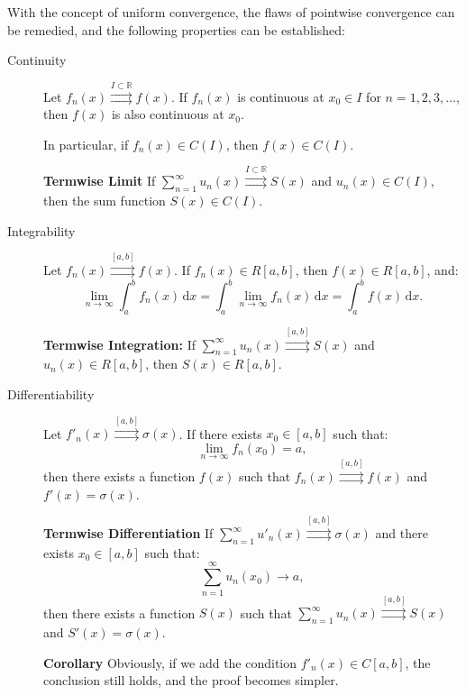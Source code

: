\documentclass[11pt]{../../TexTemplate/elegantbook}
\begin{document}
With the concept of uniform convergence, the flaws of pointwise convergence can be remedied,
and the following properties can be established:
\begin{property}
    \begin{description}
        \item  [Continuity]
            Let \( f_n(x) \mathop{\rightrightarrows}\limits^{I \subset \mathbb{R}} f(x) \). 
            If \( f_n(x) \) is continuous at \( x_0 \in I \) for \( n = 1, 2, 3, \dots \), 
            then \( f(x) \) is also continuous at \( x_0 \). 

            In particular, if \( f_n(x) \in C(I) \), then \( f(x) \in C(I) \).

            \textbf{Termwise Limit} If \( \sum_{n=1}^\infty u_n(x) \mathop{\rightrightarrows}\limits^{I \subset \mathbb{R}} S(x) \) 
            and \( u_n(x) \in C(I) \), then the sum function \( S(x) \in C(I) \).
        \item  [Integrability]
            Let \( f_n(x) \mathop{\rightrightarrows}\limits^{[a, b]} f(x) \). 
            If \( f_n(x) \in R[a, b] \), then \( f(x) \in R[a, b] \), and:
            \[
            \lim_{n \to \infty} \int_a^b f_n(x) \, \mathrm{d}x = \int_a^b \lim_{n \to \infty} f_n(x) \, \mathrm{d}x = \int_a^b f(x) \, \mathrm{d}x.
            \]

            \textbf{Termwise Integration:} If \( \sum_{n=1}^\infty u_n(x) \mathop{\rightrightarrows}\limits^{[a, b]} S(x) \) 
            and \( u_n(x) \in R[a, b] \), then \( S(x) \in R[a, b] \).

        \item [Differentiability]
            Let \( f'_n(x) \mathop{\rightrightarrows}\limits^{[a, b]} \sigma(x) \). 
            If there exists \( x_0 \in [a, b] \) such that:
            \[
            \lim_{n \to \infty} f_n(x_0) = a,
            \]
            then there exists a function \( f(x) \) such that \( f_n(x) \mathop{\rightrightarrows}\limits^{[a, b]} f(x) \) 
            and \( f'(x) = \sigma(x) \).
            
            \textbf{Termwise Differentiation} If 
            \( \sum_{n=1}^\infty u'_n(x) \mathop{\rightrightarrows}\limits^{[a, b]} \sigma(x) \) 
            and there exists \( x_0 \in [a, b] \) such that:
            \[
            \sum_{n=1}^\infty u_n(x_0) \to a,
            \]
            then there exists a function \( S(x) \) such that 
            \( \sum_{n=1}^\infty u_n(x) \mathop{\rightrightarrows}\limits^{[a, b]} S(x) \) and \( S'(x) = \sigma(x) \).

            \textbf{Corollary} Obviously, if we add the condition \( f'_n(x) \in C[a, b] \), the conclusion still holds, 
            and the proof becomes simpler.
    \end{description}
\end{property}
\end{document}
